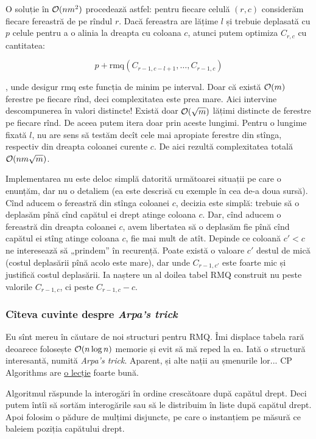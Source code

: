 \documentclass[../main.tex]{subfiles}
\begin{document}
O soluție în $\mathcal{O}(nm^2)$ procedează astfel: pentru fiecare celulă $(r,c)$ considerăm fiecare fereastră de pe rîndul $r$. Dacă fereastra are lățime $l$ și trebuie deplasată cu $p$ celule pentru a o alinia la dreapta cu coloana $c$, atunci putem optimiza $C_{r,c}$ cu cantitatea:

$$p + \textrm{rmq}(C_{r-1,c-l+1}, \dots, C_{r-1,c})$$

, unde desigur $\textrm{rmq}$ este funcția de minim pe interval. Doar că există $\mathcal{O}(m)$ ferestre pe fiecare rînd, deci complexitatea este prea mare. Aici intervine descompunerea în valori distincte! Există doar $\mathcal{O}(\sqrt{m})$ lățimi distincte de ferestre pe fiecare rînd. De aceea putem itera doar prin aceste lungimi. Pentru o lungime fixată $l$, nu are sens să testăm decît cele mai apropiate ferestre din stînga, respectiv din dreapta coloanei curente $c$. De aici rezultă complexitatea totală $\mathcal{O}(nm \sqrt{m})$.

Implementarea nu este deloc simplă datorită următoarei situații pe care o enunțăm, dar nu o detaliem (ea este descrisă cu exemple în cea de-a doua sursă). Cînd aducem o fereastră din stînga coloanei $c$, decizia este simplă: trebuie să o deplasăm pînă cînd capătul ei drept atinge coloana $c$. Dar, cînd aducem o fereastră din dreapta coloanei $c$, avem libertatea să o deplasăm fie pînă cînd capătul ei stîng atinge coloana $c$, fie mai mult de atît. Depinde ce coloană $c' < c$ ne interesează să „prindem” în recurență. Poate există o  valoare $c'$ destul de mică (costul deplasării pînă acolo este mare), dar unde $C_{r-1,c'}$ este foarte mic și justifică costul deplasării. Ia naștere un al doilea tabel RMQ construit nu peste valorile $C_{r-1,c}$, ci peste $C_{r-1,c} - c$.

\subsubsection*{Cîteva cuvinte despre \textit{Arpa's trick}}

Eu sînt mereu în căutare de noi structuri pentru RMQ.  Îmi displace tabela rară deoarece folosește  $\mathcal{O}(n \log n)$ memorie și evit să mă reped la ea. Iată o structură interesantă, numită \textit{Arpa's trick}. Aparent, și alte nații au șmenurile lor... CP Algorithms are \href{https://cp-algorithms.com/data_structures/disjoint_set_union.html#arpa}{o lecție} foarte bună.

Algoritmul răspunde la interogări în ordine crescătoare după capătul drept. Deci putem întîi să sortăm interogările sau să le distribuim în liste după capătul drept.  Apoi folosim o pădure de mulțimi disjuncte, pe care o instanțiem pe măsură ce baleiem poziția capătului drept.
\end{document}
